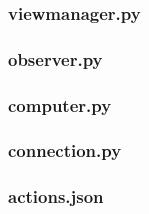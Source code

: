 \documentclass[declaration,shortabstract, inz]{iithesis}
\begin{document}
\subsubsection{view\textunderscore manager.py}

\subsubsection{observer.py}

\subsubsection{computer.py}

\subsubsection{connection.py}

% 
\subsubsection{actions.json}




\end{document}
